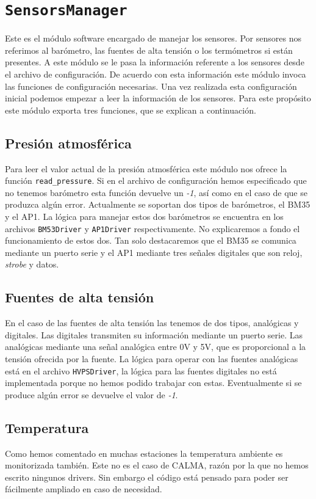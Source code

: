 \section{\texttt{SensorsManager}}
	Este es el módulo software encargado de manejar los sensores. Por sensores nos referimos al barómetro, las fuentes de alta tensión o los
	termómetros si están presentes. A este módulo se le pasa la información referente a los sensores desde el archivo de configuración. De acuerdo
	con esta información este módulo invoca las funciones de configuración necesarias. Una vez realizada esta configuración inicial podemos
	empezar a leer la información de los sensores. Para este propósito este módulo exporta tres funciones, que se explican a continuación.
	\subsection{Presión atmosférica}
		Para leer el valor actual de la presión atmosférica este módulo nos ofrece la función \texttt{read\_pressure}. Si en el archivo de
		configuración hemos especificado que no tenemos barómetro esta función devuelve un \emph{-1}, así como en el caso de que se produzca
		algún error. Actualmente se soportan dos tipos de barómetros, el BM35 y el AP1. La lógica para manejar estos dos barómetros se
		encuentra en los archivos \texttt{BM53Driver} y \texttt{AP1Driver} respectivamente. No explicaremos a fondo el funcionamiento de
		estos dos. Tan solo destacaremos que el BM35 se comunica mediante un puerto serie y el AP1 mediante tres señales digitales que son
		reloj, \emph{strobe} y datos.
	\subsection{Fuentes de alta tensión}
		En el caso de las fuentes de alta tensión las tenemos de dos tipos, analógicas y digitales. Las digitales transmiten su información
		mediante un puerto serie. Las analógicas mediante una señal analógica entre 0V y 5V, que es proporcional a la tensión ofrecida por la
		fuente. La lógica para operar con las fuentes analógicas está en el archivo \texttt{HVPSDriver}, la lógica para las fuentes digitales
		no está implementada porque no hemos podido trabajar con estas. Eventualmente si se produce algún error se devuelve el valor de
		\emph{-1}.
	\subsection{Temperatura}
		Como hemos comentado en muchas estaciones la temperatura ambiente es monitorizada también. Este no es el caso de CALMA, razón por la
		que no hemos escrito ningunos drivers. Sin embargo el código está pensado para poder ser fácilmente ampliado en caso de necesidad. 

